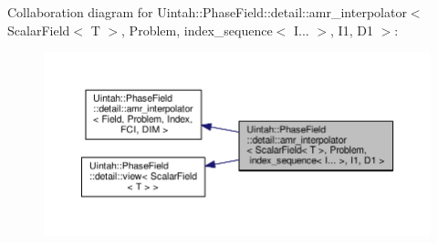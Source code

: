 Collaboration diagram for Uintah\+:\+:Phase\+Field\+:\+:detail\+:\+:amr\+\_\+interpolator$<$ Scalar\+Field$<$ T $>$, Problem, index\+\_\+sequence$<$ I... $>$, I1, D1 $>$\+:\nopagebreak
\begin{figure}[H]
\begin{center}
\leavevmode
\includegraphics[width=350pt]{classUintah_1_1PhaseField_1_1detail_1_1amr__interpolator_3_01ScalarField_3_01T_01_4_00_01Problemfaefa6495259eedf2277d002c5b0b265}
\end{center}
\end{figure}
